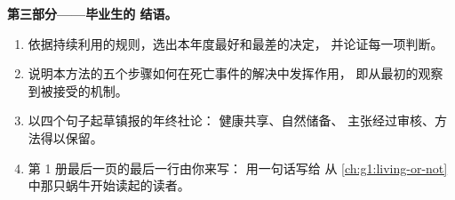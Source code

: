 \begin{problem}
\medskip\noindent\textbf{第三部分——毕业生的
结语。}
\begin{enumerate}[resume]
  \item 依据持续利用的规则，选出本年度最好和最差的决定，
        并论证每一项判断。
  \item 说明本方法的五个步骤如何在死亡事件的解决中发挥作用，
        即从最初的观察
        到被接受的机制。
  \item 以四个句子起草镇报的年终社论：
        健康共享、自然储备、
        主张经过审核、方法得以保留。
  \item 第 1 册最后一页的最后一行由你来写：
        用一句话写给
        从
        \cref{ch:g1:living-or-not}中那只蜗牛开始读起的读者。
\end{enumerate}
\end{problem}
